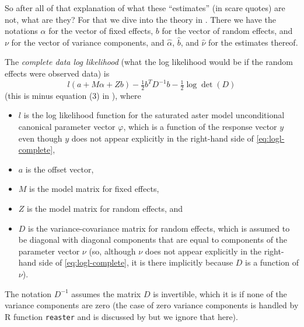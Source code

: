 \documentclass[11pt]{article}
\let\code=\texttt
\begin{document}
So after all of that explanation of what these ``estimates'' (in scare quotes)
are not, what are they?  For that we dive into the theory in
\citet[Section~2]{reaster}.  There we have the notations $\alpha$ for
the vector of fixed effects, $b$ for the vector of random effects,
and $\nu$ for the vector of variance components, and
$\hat{\alpha}$, $\hat{b}$, and $\hat{\nu}$ for the estimates thereof.

The \emph{complete data log likelihood} (what the log likelihood would be
if the random effects were observed data) is
\begin{equation} \label{eq:logl-complete}
   l(a + M \alpha + Z b) - \tfrac{1}{2} b^T D^{-1} b
   - \tfrac{1}{2} \log \det(D)
\end{equation}
(this is minus equation (3) in \citet{reaster}), where
\begin{itemize}
\item $l$ is the log likelihood function for the saturated aster model
    unconditional canonical parameter vector $\varphi$,
    which is a function of the response vector $y$ even though $y$
    does not appear explicitly in the right-hand side
    of \eqref{eq:logl-complete},
\item $a$ is the offset vector,
\item $M$ is the model matrix for fixed effects,
\item $Z$ is the model matrix for random effects, and
\item $D$ is the variance-covariance matrix for random effects,
    which is assumed to be diagonal with diagonal components that
    are equal to components of the parameter vector $\nu$ (so,
    although $\nu$ does not appear explicitly in the right-hand side
    of \eqref{eq:logl-complete}, it is there implicitly
    because $D$ is a function of $\nu$).
\end{itemize}
The notation $D^{-1}$ assumes the matrix $D$ is invertible, which it is
if none of the variance components are zero (the case of zero variance
components is handled by R function \code{reaster} and is discussed
by \citet{reaster} but we ignore that here).
\end{document}
